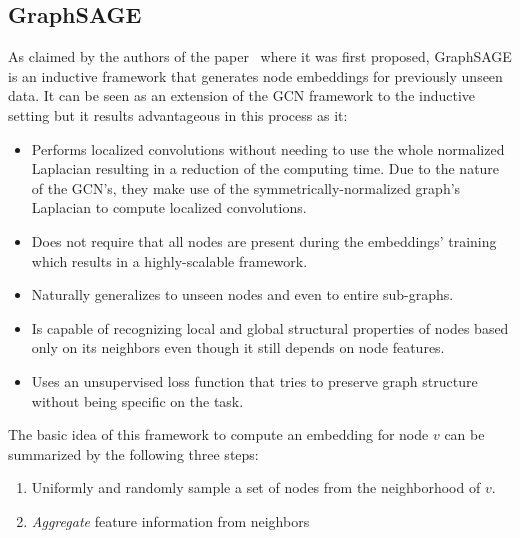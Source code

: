 


\subsection{GraphSAGE}
As claimed by the authors of the paper~\cite{graphsage} where it was first proposed, GraphSAGE is an inductive framework that generates node embeddings for previously unseen data. It can be seen as an extension of the GCN framework to the inductive setting but it results advantageous in this process as it:
\begin{itemize}
    \item Performs localized convolutions without needing to use the whole normalized Laplacian resulting in a reduction of the computing time. Due to the nature of the GCN's, they make use of the symmetrically-normalized graph's Laplacian to compute localized convolutions.
    \item Does not require that all nodes are present during the embeddings' training which results in a highly-scalable framework.
    \item Naturally generalizes to unseen nodes and even to entire sub-graphs.
    \item Is capable of recognizing local and global structural properties of nodes based only on its neighbors even though it still depends on node features.
    \item Uses an unsupervised loss function that tries to preserve graph structure without being specific on the task.
\end{itemize}

The basic idea of this framework to compute an embedding for node $v$ can be summarized by the following three steps:
\begin{enumerate}
    \item Uniformly and randomly sample a set of nodes from the neighborhood of $v$.
    \item \textit{Aggregate} feature information from neighbors
\end{enumerate}

